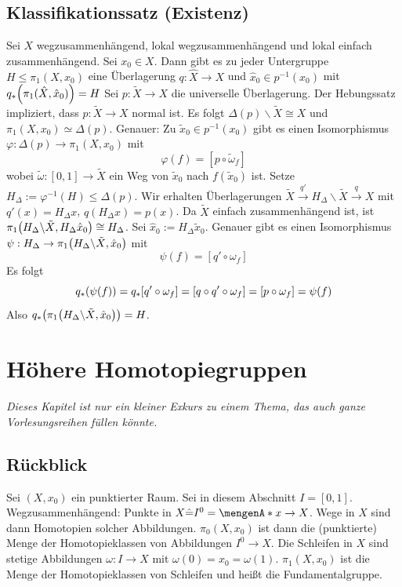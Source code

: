 \subsection{Klassifikationssatz (Existenz)} %
\label{sub:135}
Sei $X$ wegzusammenhängend, lokal wegzusammenhängend und lokal einfach zusammenhängend. Sei $x_0 \in X$. Dann gibt es zu jeder Untergruppe $H \le \pi_1(X,x_0)$ eine
Überlagerung $q : \hat{X} \to X$ und $\hat{x}_0 \in p ^{-1} (x_0)$ mit $q_* \enbrace*{\pi_1(\hat{X}, \hat{x}_0)} = H $
Sei $p : \tilde{X} \to X$ die universelle Überlagerung. Der Hebungssatz impliziert, dass $p : \tilde{X} \to X$ normal ist. Es folgt $\Delta(p) \backslash \tilde{X} \cong X$
und $\pi_1(X, x_0) \simeq \Delta(p)$. Genauer: Zu $\tilde{x}_0 \in p ^{-1}(x_0)$ gibt es einen Isomorphismus $\varphi : \Delta (p) \to \pi_1(X,x_0)$ mit 
\[
	\varphi(f) = [p \circ \tilde{\omega}_f]
\]
wobei $\tilde{\omega} : [0,1] \to \tilde{X}$ ein Weg von $\tilde{x}_0$ nach $f (\tilde{x}_0)$ ist. Setze $H_\Delta := \varphi ^{-1}(H)  \le \Delta(p)$. Wir erhalten
Überlagerungen $\tilde{X} \xrightarrow{q'} H_\Delta \backslash \tilde{X} \xrightarrow{q} X $ mit $q'(x) = H_\Delta x$, $q (H_\Delta x) = p(x)$. Da $\tilde{X}$ einfach
zusammenhängend ist, ist $\pi_1 \enbrace*{ H_\Delta \backslash \tilde{X}, H_\Delta \hat{x}_0} \cong H_\Delta$. Sei $\hat{x}_0 := H_\Delta \tilde{x}_0$.
Genauer gibt es einen Isomorphismus $\psi : H_\Delta \to \pi_1 \enbrace*{H_\Delta \backslash \tilde{X}, \hat{x}_0}$ mit
\[
	\psi(f) = [q' \circ  \omega_f]
\]
Es folgt 
\[
	q_* \enbrace*{\psi(f)} = q_* [q' \circ \omega_f] = [q \circ q' \circ \omega_f] = [p \circ \omega_f] = \psi(f) 
\]
Also $q_* \enbrace*{\pi_1 \enbrace*{H_\Delta \backslash \tilde{X}, \hat{x}_0}} = H $. \bewende
\newpage

\section{Höhere Homotopiegruppen} %
\label{sec:14}
\emph{Dieses Kapitel ist nur ein kleiner Exkurs zu einem Thema, das auch ganze Vorlesungsreihen füllen könnte.}
\subsection{Rückblick} %
\label{sub:141}
Sei $(X,x_0)$ ein punktierter Raum. Sei in diesem Abschnitt $I= [0,1]$. Wegzusammenhängend: Punkte in $X \hat{=} I^0 = \set{x} \to X$. Wege in $X$ sind dann Homotopien 
solcher Abbildungen. $\pi_0(X,x_0) $ ist dann die (punktierte) Menge der Homotopieklassen von Abbildungen $I^0 \to X$. Die Schleifen in $X$ sind
stetige Abbildungen $\omega : I\to X$ mit $\omega(0)= x_0 = \omega(1)$. $\pi_1(X,x_0)$ ist die Menge der Homotopieklassen von Schleifen und heißt die Fundamentalgruppe.

